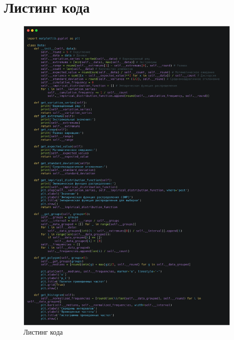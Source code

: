 \documentclass[14pt]{extreport}
\begin{document}
        \section{Листинг кода}
        \begin{figure}[!h]
            \centering
            \includegraphics[width=0.87\linewidth]{code.png}
            \caption{Листинг кода}
        \end{figure}
\end{document}
